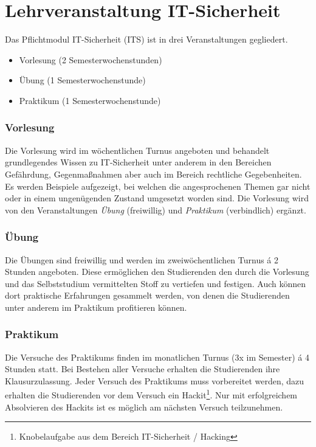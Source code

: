 \section{Lehrveranstaltung IT-Sicherheit} \label{sec:Lehrveranstaltung_IT-Sicherheit}

Das Pflichtmodul IT-Sicherheit (ITS) ist in drei Veranstaltungen gegliedert.\cite[S.30]{hochschuleniederrheinModulhandbuchVollzeitBA2019}
\begin{itemize}
	\item Vorlesung (2 Semesterwochenstunden)
	\item Übung (1 Semesterwochenstunde)
	\item Praktikum (1 Semesterwochenstunde)
\end{itemize}

\subsubsection{Vorlesung}
Die Vorlesung wird im wöchentlichen Turnus angeboten und behandelt grundlegendes Wissen zu IT-Sicherheit unter anderem in den Bereichen Gefährdung, Gegenmaßnahmen aber auch im Bereich rechtliche Gegebenheiten. Es werden Beispiele aufgezeigt, bei welchen die angesprochenen Themen gar nicht oder in einem ungenügenden Zustand umgesetzt worden sind. Die Vorlesung wird von den Veranstaltungen \textit{Übung} (freiwillig) und \textit{Praktikum} (verbindlich) ergänzt.

\subsubsection{Übung}
Die Übungen sind freiwillig und werden im zweiwöchentlichen Turnus á 2 Stunden angeboten. Diese ermöglichen den Studierenden den durch die Vorlesung und das Selbststudium vermittelten Stoff zu vertiefen und festigen. Auch können dort praktische Erfahrungen gesammelt werden, von denen die Studierenden unter anderem im Praktikum profitieren können.

\subsubsection{Praktikum}
Die Versuche des Praktikums finden im monatlichen Turnus (3x im Semester) á 4 Stunden statt. Bei Bestehen aller Versuche erhalten die Studierenden ihre Klausurzulassung. Jeder Versuch des Praktikums muss vorbereitet werden, dazu erhalten die Studierenden vor dem Versuch ein Hackit\footnote{Knobelaufgabe aus dem Bereich IT-Sicherheit / Hacking}. Nur mit erfolgreichem Absolvieren des Hackits ist es möglich am nächsten Versuch teilzunehmen.\cite{quadePraktikumITSecurity2017}